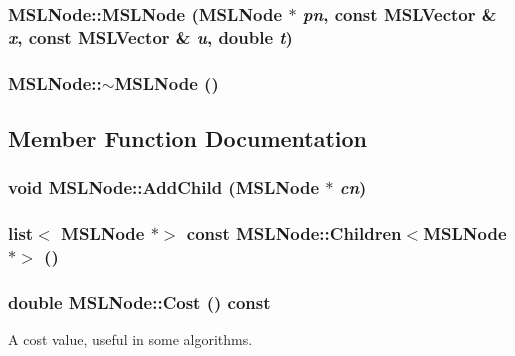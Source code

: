 \subsubsection{\setlength{\rightskip}{0pt plus 5cm}MSLNode::MSLNode (MSLNode $\ast$ {\em pn}, const {\bf MSLVector} \& {\em x}, const {\bf MSLVector} \& {\em u}, double {\em t})}\label{class_MSLNode_a11}


\subsubsection{\setlength{\rightskip}{0pt plus 5cm}MSLNode::$\sim$MSLNode ()\hspace{0.3cm}{\tt  [inline]}}\label{class_MSLNode_a12}




\subsection{Member Function Documentation}
\subsubsection{\setlength{\rightskip}{0pt plus 5cm}void MSLNode::Add\-Child (MSLNode $\ast$ {\em cn})\hspace{0.3cm}{\tt  [inline]}}\label{class_MSLNode_a13}


\subsubsection{\setlength{\rightskip}{0pt plus 5cm}list$<$ MSLNode $\ast$$>$ const MSLNode::Children$<$MSLNode$\ast$$>$ ()\hspace{0.3cm}{\tt  [inline]}}\label{class_MSLNode_a3}


\subsubsection{\setlength{\rightskip}{0pt plus 5cm}double MSLNode::Cost () const\hspace{0.3cm}{\tt  [inline]}}\label{class_MSLNode_a5}


A cost value, useful in some algorithms.

